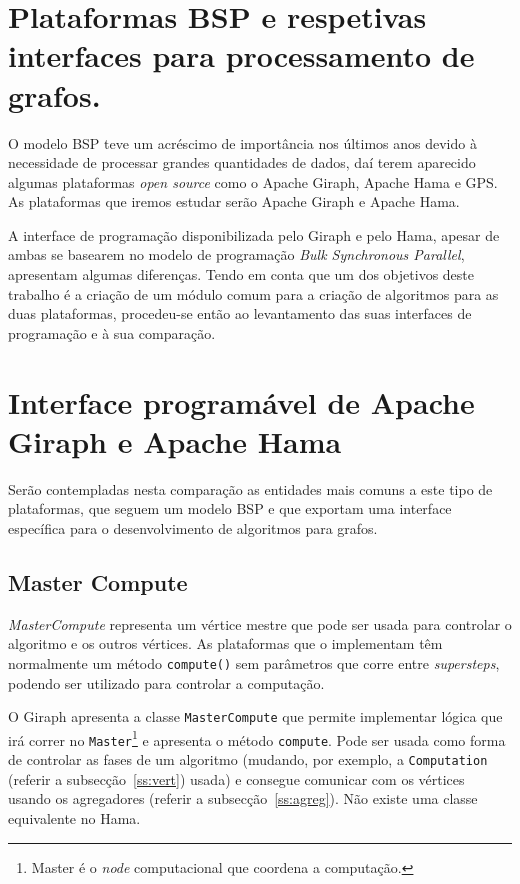 \section{Plataformas BSP e respetivas interfaces para processamento de grafos.}

O modelo BSP teve um acréscimo de importância nos últimos anos devido à 
necessidade de processar grandes quantidades de dados, daí terem aparecido 
algumas plataformas \textit{open source} como o Apache Giraph, Apache Hama e 
GPS. As plataformas que iremos estudar serão Apache Giraph e 
Apache Hama.

A interface de programação disponibilizada pelo Giraph e pelo Hama, apesar de 
ambas se basearem no modelo de programação \textit{Bulk Synchronous Parallel}, 
apresentam algumas diferenças. Tendo em conta que um dos objetivos deste 
trabalho é a criação de um módulo comum para a criação de algoritmos para as 
duas plataformas, procedeu-se então ao levantamento das suas interfaces de 
programação e à sua comparação. 

\section{Interface programável de Apache Giraph e Apache Hama}
Serão contempladas nesta comparação as entidades mais comuns a este tipo de 
plataformas, que seguem um modelo BSP e que exportam uma interface específica 
para o desenvolvimento de algoritmos para grafos. 

\subsection{Master Compute}
\textit{MasterCompute} representa um vértice mestre que pode ser usada para controlar o algoritmo e os outros vértices. As plataformas que o implementam têm normalmente um método \texttt{compute()} sem parâmetros que corre entre \textit{supersteps}, podendo ser utilizado para controlar a computação.


O Giraph apresenta a classe \texttt{MasterCompute} que permite implementar lógica que irá correr no \texttt{Master}\footnote{Master é o \textit{node} computacional que coordena a computação.} e apresenta o método \texttt{compute}. Pode ser usada como forma de controlar as fases de um algoritmo (mudando, por exemplo, a \texttt{Computation} (referir a subsecção~\ref{ss:vert}) usada) e consegue comunicar com os vértices usando os agregadores (referir a subsecção~\ref{ss:agreg}). Não existe uma classe equivalente no Hama.











%
